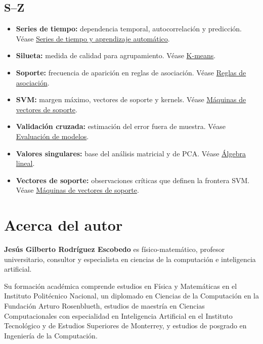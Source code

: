 \documentclass[
  spanish,
  10.5pt,
  letterpaper,
  DIV=11,
  numbers=noendperiod,
  oneside,
  open=any]{scrreprt}
\providecommand{\tightlist}{%
  \setlength{\itemsep}{0pt}\setlength{\parskip}{0pt}}
\theoremstyle{definition}
\theoremstyle{definition}
\theoremstyle{plain}
\theoremstyle{remark}
\begin{document}
\section*{S--Z}\label{sz-1}


\begin{itemize}
\tightlist
\item
  \textbf{Series de tiempo:} dependencia temporal, autocorrelación y
  predicción. Véase \hyperref[sec-series-tiempo]{Series de tiempo y
  aprendizaje automático}.
\item
  \textbf{Silueta:} medida de calidad para agrupamiento. Véase
  \hyperref[sec-kmeans]{K-means}.
\item
  \textbf{Soporte:} frecuencia de aparición en reglas de asociación.
  Véase \hyperref[sec-reglas-asociacion]{Reglas de asociación}.
\item
  \textbf{SVM:} margen máximo, vectores de soporte y kernels. Véase
  \hyperref[sec-svm]{Máquinas de vectores de soporte}.
\item
  \textbf{Validación cruzada:} estimación del error fuera de muestra.
  Véase \hyperref[sec-evaluacion-modelos]{Evaluación de modelos}.
\item
  \textbf{Valores singulares:} base del análisis matricial y de PCA.
  Véase \hyperref[sec-algebra-lineal]{Álgebra lineal}.
\item
  \textbf{Vectores de soporte:} observaciones críticas que definen la
  frontera SVM. Véase \hyperref[sec-svm]{Máquinas de vectores de
  soporte}.
\end{itemize}


\chapter*{Acerca del autor}\label{acerca-del-autor}


\textbf{Jesús Gilberto Rodríguez Escobedo} es físico-matemático,
profesor universitario, consultor y especialista en ciencias de la
computación e inteligencia artificial.

Su formación académica comprende estudios en Física y Matemáticas en el
Instituto Politécnico Nacional, un diplomado en Ciencias de la
Computación en la Fundación Arturo Rosenblueth, estudios de maestría en
Ciencias Computacionales con especialidad en Inteligencia Artificial en
el Instituto Tecnológico y de Estudios Superiores de Monterrey, y
estudios de posgrado en Ingeniería de la Computación.
\end{document}
